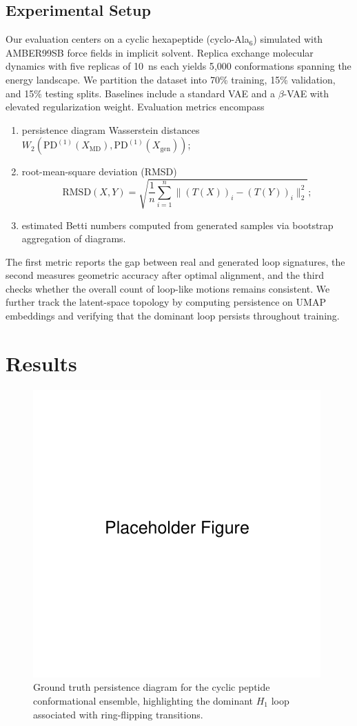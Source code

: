 \documentclass[11pt]{article}
\begin{document}
\subsection{Experimental Setup}
Our evaluation centers on a cyclic hexapeptide (cyclo-Ala$_6$) simulated with AMBER99SB force fields in implicit solvent. Replica exchange molecular dynamics with five replicas of 10~ns each yields 5{,}000 conformations spanning the energy landscape. We partition the dataset into 70\% training, 15\% validation, and 15\% testing splits. Baselines include a standard VAE and a $\beta$-VAE with elevated regularization weight. Evaluation metrics encompass
\begin{enumerate}[label=\roman*)]
    \item persistence diagram Wasserstein distances $W_{2}(\mathrm{PD}^{(1)}(X_{\text{MD}}), \mathrm{PD}^{(1)}(X_{\text{gen}}))$;
    \item root-mean-square deviation (RMSD)
    \begin{equation}
        \mathrm{RMSD}(X, Y) = \sqrt{\frac{1}{n} \sum_{i=1}^n \big\| (T(X))_i - (T(Y))_i \big\|_2^2};
        \label{eq:rmsd}
    \end{equation}
    \item estimated Betti numbers computed from generated samples via bootstrap aggregation of diagrams.
\end{enumerate}
The first metric reports the gap between real and generated loop signatures, the second measures geometric accuracy after optimal alignment, and the third checks whether the overall count of loop-like motions remains consistent. We further track the latent-space topology by computing persistence on UMAP embeddings and verifying that the dominant loop persists throughout training.

\section{Results}
\begin{figure}[t]
    \centering
    \includegraphics[width=0.75\linewidth]{figures/placeholder.pdf}
    \caption{Ground truth persistence diagram for the cyclic peptide conformational ensemble, highlighting the dominant $H_1$ loop associated with ring-flipping transitions.}
    \label{fig:groundtruth_pd}
\end{figure}
\end{document}

